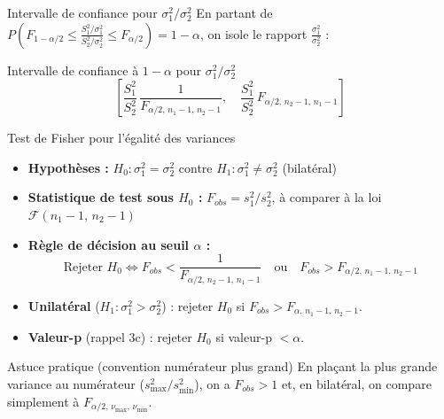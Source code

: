 \documentclass{BeamerTemplate}
\begin{document}
\begin{frame}[t]{Intervalle de confiance pour $\sigma_1^2 / \sigma_2^2$}
  En partant de $P\left(F_{1-\alpha/2} \le \frac{S_1^2/\sigma_1^2}{S_2^2/\sigma_2^2} \le F_{\alpha/2}\right) = 1 - \alpha$, on isole le rapport $\frac{\sigma_1^2}{\sigma_2^2}$ :

  \bigskip
  \begin{Boite}{Intervalle de confiance à $1-\alpha$ pour $\sigma_1^2 / \sigma_2^2$}
    $$\left[ \frac{S_1^2}{S_2^2} \, \frac{1}{F_{\alpha/2,\, n_1-1,\, n_2-1}}, \quad \frac{S_1^2}{S_2^2} \, F_{\alpha/2,\, n_2-1,\, n_1-1} \right]$$
  \end{Boite}

  \bigskip
\end{frame}

\begin{frame}[t]{Test de Fisher pour l'égalité des variances}
  \begin{itemize}\itemsep 1mm
    \item \textbf{Hypothèses :} $H_0: \sigma_1^2 = \sigma_2^2$ \quad contre \quad $H_1: \sigma_1^2 \ne \sigma_2^2$ (bilatéral)
    \item \textbf{Statistique de test sous $H_0$ :}
      $F_{obs} = s_1^2 / s_2^2$, à comparer à la loi $\mathcal{F}(n_1-1,\, n_2-1)$
    \item \textbf{Règle de décision au seuil $\alpha$ :}
      $$\text{Rejeter } H_0 \iff F_{obs} < \frac{1}{F_{\alpha/2,\, n_2-1,\, n_1-1}} \quad \text{ou} \quad F_{obs} > F_{\alpha/2,\, n_1-1,\, n_2-1}$$
    \item \textbf{Unilatéral} ($H_1: \sigma_1^2 > \sigma_2^2$) : rejeter $H_0$ si $F_{obs} > F_{\alpha,\, n_1-1,\, n_2-1}$.
    \item \textbf{Valeur-p} (rappel 3c) : rejeter $H_0$ si valeur-p $< \alpha$.
  \end{itemize}

  \pause
  \begin{Boite}{Astuce pratique (convention numérateur plus grand)}
    En plaçant la plus grande variance au numérateur ($s_{\max}^2 / s_{\min}^2$), on a $F_{obs} > 1$ et, en bilatéral, on compare simplement à $F_{\alpha/2,\, \nu_{\max},\, \nu_{\min}}$.
  \end{Boite}
\end{frame}
\end{document}

